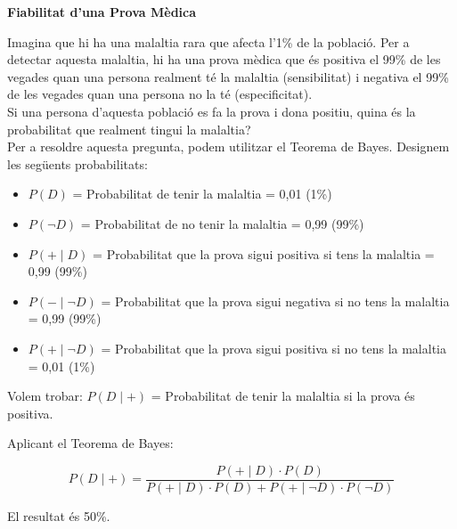 \documentclass[12pt]{article}
\begin{document}
\begin{exemple} [title=Exemple 4]\noindent 
\textbf{Fiabilitat d'una Prova Mèdica}

Imagina que hi ha una malaltia rara que afecta l'1\% de la població. Per a detectar aquesta malaltia, hi ha una prova mèdica que és positiva el 99\% de les vegades quan una persona realment té la malaltia (sensibilitat) i negativa el 99\% de les vegades quan una persona no la té (especificitat).\\

Si una persona d'aquesta població es fa la prova i dona positiu, quina és la probabilitat que realment tingui la malaltia?\\

Per a resoldre aquesta pregunta, podem utilitzar el Teorema de Bayes. Designem les següents probabilitats:

\begin{itemize}
    \item $P(D)$ = Probabilitat de tenir la malaltia = 0,01 (1\%)
    \item $P(\neg D)$ = Probabilitat de no tenir la malaltia = 0,99 (99\%)
    \item $P(+ \mid D)$ = Probabilitat que la prova sigui positiva si tens la malaltia = 0,99 (99\%)
    \item $P(- \mid \neg D)$ = Probabilitat que la prova sigui negativa si no tens la malaltia = 0,99 (99\%)
    \item $P(+ \mid \neg D)$ = Probabilitat que la prova sigui positiva si no tens la malaltia = 0,01 (1\%)
\end{itemize}

Volem trobar: $P(D \mid +)$ = Probabilitat de tenir la malaltia si la prova és positiva.

Aplicant el Teorema de Bayes:

\[
P(D \mid +) = \frac{P(+ \mid D) \cdot P(D)}{P(+ \mid D) \cdot P(D) + P(+ \mid \neg D) \cdot P(\neg D)}
\]

El resultat és 50\%.
\end{exemple}
\end{document}
